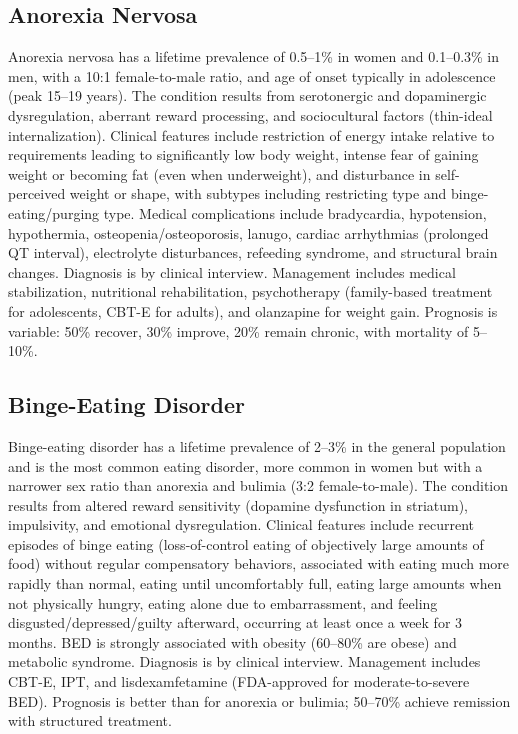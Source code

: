 


\label{sec:Eating Disorders}

\subsection{Anorexia Nervosa}
\label{sec:Anorexia Nervosa}
Anorexia nervosa has a lifetime prevalence of 0.5--1\% in women and 0.1--0.3\% in men, with a 10:1 female-to-male ratio, and age of onset typically in adolescence (peak 15--19 years). The condition results from serotonergic and dopaminergic dysregulation, aberrant reward processing, and sociocultural factors (thin-ideal internalization). Clinical features include restriction of energy intake relative to requirements leading to significantly low body weight, intense fear of gaining weight or becoming fat (even when underweight), and disturbance in self-perceived weight or shape, with subtypes including restricting type and binge-eating/purging type. Medical complications include bradycardia, hypotension, hypothermia, osteopenia/osteoporosis, lanugo, cardiac arrhythmias (prolonged QT interval), electrolyte disturbances, refeeding syndrome, and structural brain changes. Diagnosis is by clinical interview. Management includes medical stabilization, nutritional rehabilitation, psychotherapy (family-based treatment for adolescents, CBT-E for adults), and olanzapine for weight gain. Prognosis is variable: 50\% recover, 30\% improve, 20\% remain chronic, with mortality of 5--10\%.

\subsection{Binge-Eating Disorder}
\label{sec:Binge-Eating Disorder}
Binge-eating disorder has a lifetime prevalence of 2--3\% in the general population and is the most common eating disorder, more common in women but with a narrower sex ratio than anorexia and bulimia (3:2 female-to-male). The condition results from altered reward sensitivity (dopamine dysfunction in striatum), impulsivity, and emotional dysregulation. Clinical features include recurrent episodes of binge eating (loss-of-control eating of objectively large amounts of food) without regular compensatory behaviors, associated with eating much more rapidly than normal, eating until uncomfortably full, eating large amounts when not physically hungry, eating alone due to embarrassment, and feeling disgusted/depressed/guilty afterward, occurring at least once a week for 3 months. BED is strongly associated with obesity (60--80\% are obese) and metabolic syndrome. Diagnosis is by clinical interview. Management includes CBT-E, IPT, and lisdexamfetamine (FDA-approved for moderate-to-severe BED). Prognosis is better than for anorexia or bulimia; 50--70\% achieve remission with structured treatment.

